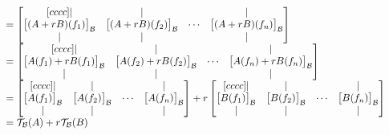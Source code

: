 \documentclass[12pt]{article}
\begin{document}
$\begin{array}{r@{}>{\displaystyle}ll}
	 & {}= \begin{bmatrix}[cccc]
		|                                 & |                                 &        & |                                 \\
		\big[(A+rB)(f_1)\big]_\mathcal{B} & \big[(A+rB)(f_2)\big]_\mathcal{B} & \cdots & \big[(A+rB)(f_n)\big]_\mathcal{B} \\
		|                                 & |                                 &        & |                                 \\
	\end{bmatrix}                               & \\
	 & {}= \begin{bmatrix}[cccc]
		|                                    & |                                    &        & |                                    \\
		\big[A(f_1)+rB(f_1)\big]_\mathcal{B} & \big[A(f_2)+rB(f_2)\big]_\mathcal{B} & \cdots & \big[A(f_n)+rB(f_n)\big]_\mathcal{B} \\
		|                                    & |                                    &        & |                                    \\
	\end{bmatrix}                               & \\
	 & {}= \begin{bmatrix}[cccc]
		|                            & |                            &        & |                            \\
		\big[A(f_1)\big]_\mathcal{B} & \big[A(f_2)\big]_\mathcal{B} & \cdots & \big[A(f_n)\big]_\mathcal{B} \\
		|                            & |                            &        & |                            \\
	\end{bmatrix} + r\begin{bmatrix}[cccc]
		|                            & |                            &        & |                            \\
		\big[B(f_1)\big]_\mathcal{B} & \big[B(f_2)\big]_\mathcal{B} & \cdots & \big[B(f_n)\big]_\mathcal{B} \\
		|                            & |                            &        & |                            \\
	\end{bmatrix} & \\
	 & {}= \mathcal{T}_\mathcal{B}(A) + r\mathcal{T}_\mathcal{B}(B) & \\
\end{array}$\\
\end{document}
